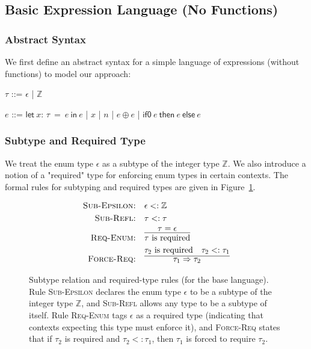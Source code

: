 \documentclass[10pt,conference]{IEEEtran}
\newcommand{\Z}{\ensuremath{\mathbb{Z}}}
\newcommand{\lett}[4]{\ensuremath{\mathsf{let}\ #1\mathsf{:}\,#2\ \mathsf{=}\ #3\ \mathsf{in}\ #4}}
\newcommand{\binop}[2]{\ensuremath{#1\ \mathsf{\oplus}\ #2}}
\newcommand{\ternary}[3]{\ensuremath{\mathsf{if0}\ #1\ \mathsf{then}\ #2\ \mathsf{else}\ #3}}
\newcommand{\required}[1]{\ensuremath{#1\text{ is required}}}
\newcommand{\forcerequire}[2]{\ensuremath{#1\Rightarrow#2}}
\begin{document}
\subsection{Basic Expression Language (No Functions)}
\subsubsection{Abstract Syntax}
We first define an abstract syntax for a simple language of expressions (without functions) to model our approach:

\vspace{0.5em}
\begin{bnf}
    $\tau$ ::= $\epsilon$ | $\Z$
\end{bnf}

\begin{bnf}
    $e$ ::= \lett{x}{\tau}{e}{e} 
    | $x$ 
    | $n$ 
    | \binop{e}{e} 
    | \ternary{e}{e}{e}
\end{bnf}
\vspace{0.5em}

\subsubsection{Subtype and Required Type}
We treat the enum type $\epsilon$ as a subtype of the integer type $\Z$. We also introduce a notion of a "required" type for enforcing enum types in certain contexts. The formal rules for subtyping and required types are given in Figure~\ref{fig:subtype-required-rules}.

\begin{figure}[ht]
\centering
\begin{framed}
\begin{align*}
\text{\textsc{Sub-Epsilon:}} &\quad \epsilon <: \Z \\
\text{\textsc{Sub-Refl:}} &\quad \tau <: \tau \\
\text{\textsc{Req-Enum:}} &\quad \infer{\required{\tau}}{\tau = \epsilon} \\
\text{\textsc{Force-Req:}} &\quad \infer{\forcerequire{\tau_1}{\tau_2}}{\required{\tau_2} \quad \tau_2 <: \tau_1}
\end{align*}
\end{framed}
\caption{Subtype relation and required-type rules (for the base language). Rule \textsc{Sub-Epsilon} declares the enum type $\epsilon$ to be a subtype of the integer type $\Z$, and \textsc{Sub-Refl} allows any type to be a subtype of itself. Rule \textsc{Req-Enum} tags $\epsilon$ as a required type (indicating that contexts expecting this type must enforce it), and \textsc{Force-Req} states that if $\tau_2$ is required and $\tau_2 <: \tau_1$, then $\tau_1$ is forced to require $\tau_2$.}
\label{fig:subtype-required-rules}
\end{figure}
\end{document}
